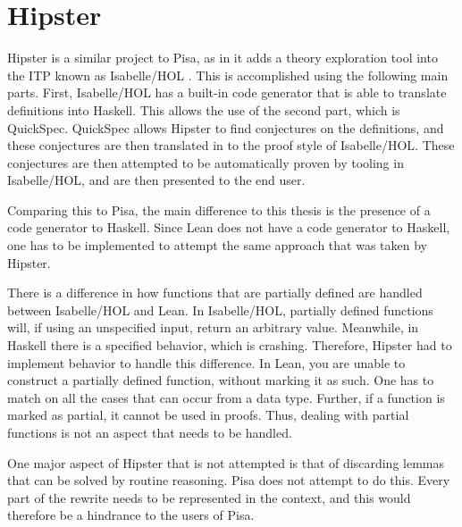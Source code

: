 \section{Hipster}\label{sec:hipster}
Hipster is a similar project to Pisa, as in it adds a theory exploration tool into the ITP known as Isabelle/HOL \autocite{Hipster}.
This is accomplished using the following main parts.
First, Isabelle/HOL has a built-in code generator that is able to translate definitions into Haskell.
This allows the use of the second part, which is QuickSpec.
QuickSpec allows Hipster to find conjectures on the definitions, and these conjectures are then translated in to the proof style of Isabelle/HOL.
These conjectures are then attempted to be automatically proven by tooling in Isabelle/HOL, and are then presented to the end user.

Comparing this to Pisa, the main difference to this thesis is the presence of a code generator to Haskell.
Since Lean does not have a code generator to Haskell, one has to be implemented to attempt the same approach that was taken by Hipster.

There is a difference in how functions that are partially defined are handled between Isabelle/HOL and Lean.
In Isabelle/HOL, partially defined functions will, if using an unspecified input, return an arbitrary value.
Meanwhile, in Haskell there is a specified behavior, which is crashing.
Therefore, Hipster had to implement behavior to handle this difference.
In Lean, you are unable to construct a partially defined function, without marking it as such.
One has to match on all the cases that can occur from a data type.
Further, if a function is marked as partial, it cannot be used in proofs.
Thus, dealing with partial functions is not an aspect that needs to be handled.

One major aspect of Hipster that is not attempted is that of discarding lemmas that can be solved by routine reasoning.
Pisa does not attempt to do this.
Every part of the rewrite needs to be represented in the context, and this would therefore be a hindrance to the users of Pisa.
